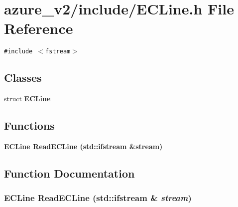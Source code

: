 \section{azure\_\-v2/include/ECLine.h File Reference}
\label{ECLine_8h}
{\tt \#include $<$fstream$>$}\par
\subsection*{Classes}
\begin{CompactItemize}
\item 
struct \bf{ECLine}
\end{CompactItemize}
\subsection*{Functions}
\begin{CompactItemize}
\item 
\bf{ECLine} \bf{Read\-ECLine} (std::ifstream \&stream)
\end{CompactItemize}


\subsection{Function Documentation}
\subsubsection{\setlength{\rightskip}{0pt plus 5cm}\bf{ECLine} Read\-ECLine (std::ifstream \& {\em stream})}\label{ECLine_8h_034ec92e8c55be47fa6ebd2dcd3477bd}


